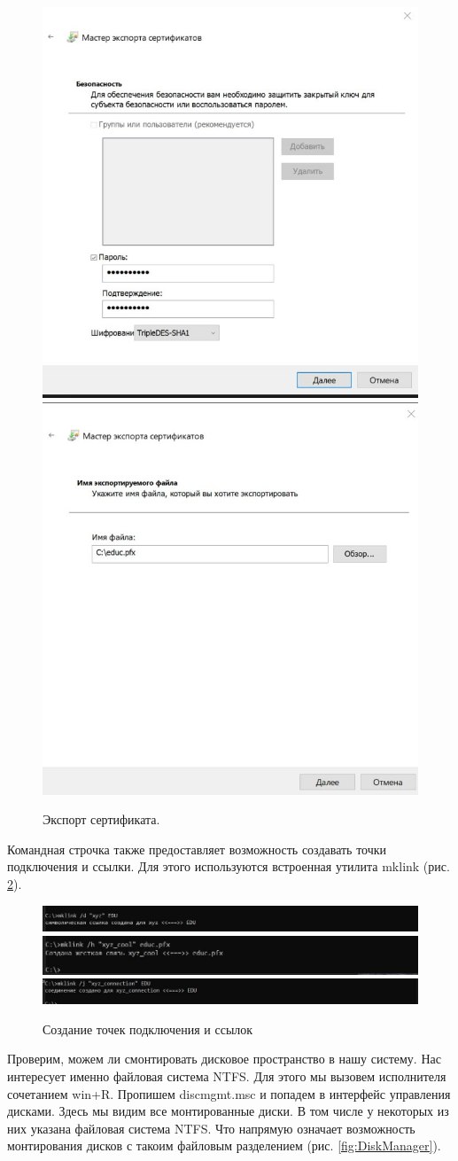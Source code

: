 \begin{figure}
    \centering
    \includegraphics[width=0.3\linewidth]{Pic/lab2/photo_2025-05-21_21-19-17.jpg}
    \includegraphics[width=0.3\linewidth]{Pic/lab2/photo_2025-05-21_21-19-19.jpg}
    \caption{Экспорт сертификата.}
    \label{fig:ExportP2}
\end{figure}
\newpage

Командная строчка также предоставляет возможность создавать точки подключения и ссылки. Для этого используются встроенная утилита mklink (рис. \ref{fig:DotCon}).

\begin{figure}
    \centering
    \includegraphics[width=\linewidth]{Pic/lab2/photo_2025-05-21_21-19-21.jpg}
    \includegraphics[width=\linewidth]{Pic/lab2/photo_2025-05-21_21-19-23.jpg}
    \includegraphics[width=\linewidth]{Pic/lab2/photo_2025-05-21_21-19-24.jpg}
    \caption{Создание точек подключения и ссылок}
    \label{fig:DotCon}
\end{figure}

Проверим, можем ли смонтировать дисковое пространство в нашу систему. Нас интересует именно файловая система NTFS. Для этого мы вызовем исполнителя сочетанием win+R. Пропишем discmgmt.msc и попадем в интерфейс управления дисками. Здесь мы видим все монтированные диски. В том числе у некоторых из них указана файловая система NTFS. Что напрямую означает возможность монтирования дисков с такоим файловым разделением (рис. \ref{fig:DiskManager}).

